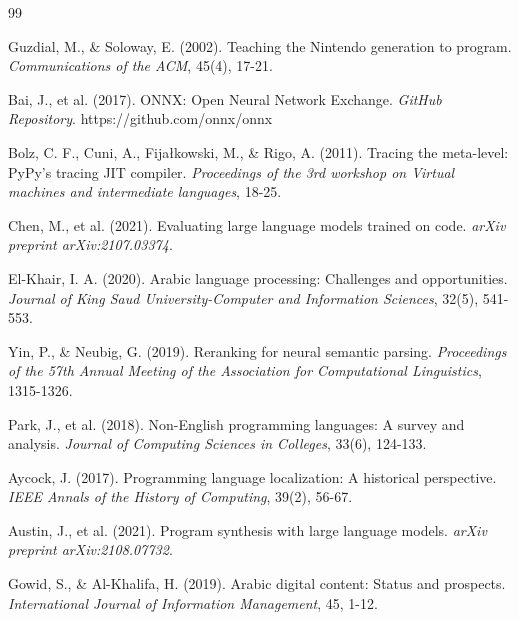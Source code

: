\documentclass[11pt,a4paper]{article}
\begin{document}

\begin{thebibliography}{99}

Guzdial, M., \& Soloway, E. (2002). Teaching the Nintendo generation to program. \textit{Communications of the ACM}, 45(4), 17-21.

Bai, J., et al. (2017). ONNX: Open Neural Network Exchange. \textit{GitHub Repository}. https://github.com/onnx/onnx

Bolz, C. F., Cuni, A., Fijałkowski, M., \& Rigo, A. (2011). Tracing the meta-level: PyPy's tracing JIT compiler. \textit{Proceedings of the 3rd workshop on Virtual machines and intermediate languages}, 18-25.

Chen, M., et al. (2021). Evaluating large language models trained on code. \textit{arXiv preprint arXiv:2107.03374}.

El-Khair, I. A. (2020). Arabic language processing: Challenges and opportunities. \textit{Journal of King Saud University-Computer and Information Sciences}, 32(5), 541-553.

Yin, P., \& Neubig, G. (2019). Reranking for neural semantic parsing. \textit{Proceedings of the 57th Annual Meeting of the Association for Computational Linguistics}, 1315-1326.

Park, J., et al. (2018). Non-English programming languages: A survey and analysis. \textit{Journal of Computing Sciences in Colleges}, 33(6), 124-133.

Aycock, J. (2017). Programming language localization: A historical perspective. \textit{IEEE Annals of the History of Computing}, 39(2), 56-67.

Austin, J., et al. (2021). Program synthesis with large language models. \textit{arXiv preprint arXiv:2108.07732}.

Gowid, S., \& Al-Khalifa, H. (2019). Arabic digital content: Status and prospects. \textit{International Journal of Information Management}, 45, 1-12.

\end{thebibliography}

\appendix
\end{document}
